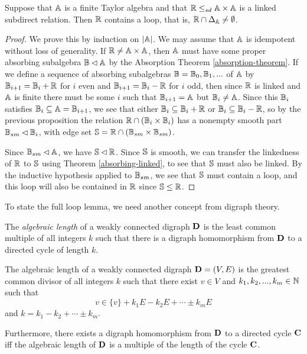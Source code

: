 \documentclass[letterpaper,11pt]{article}
\begin{document}
\begin{lem}\label{loop-linked} Suppose that $\mathbb{A}$ is a finite Taylor algebra and that $\mathbb{R} \le_{sd} \mathbb{A}\times \mathbb{A}$ is a linked subdirect relation. Then $\mathbb{R}$ contains a loop, that is, $\mathbb{R} \cap \Delta_{\mathbb{A}} \ne \emptyset$.
\end{lem}
\begin{proof} We prove this by induction on $|\mathbb{A}|$. We may assume that $\mathbb{A}$ is idempotent without loss of generality. If $\mathbb{R} \ne \mathbb{A}\times \mathbb{A}$, then $\mathbb{A}$ must have some proper absorbing subalgebra $\mathbb{B} \lhd \mathbb{A}$ by the Absorption Theorem \ref{absorption-theorem}. If we define a sequence of absorbing subalgebras $\mathbb{B} = \mathbb{B}_0, \mathbb{B}_1, ...$ of $\mathbb{A}$ by $\mathbb{B}_{i+1} = \mathbb{B}_i + \mathbb{R}$ for $i$ even and $\mathbb{B}_{i+1} = \mathbb{B}_i - \mathbb{R}$ for $i$ odd, then since $\mathbb{R}$ is linked and $\mathbb{A}$ is finite there must be some $i$ such that $\mathbb{B}_{i+1} = \mathbb{A}$ but $\mathbb{B}_i \ne \mathbb{A}$. Since this $\mathbb{B}_i$ satisfies $\mathbb{B}_i \subseteq \mathbb{A} = \mathbb{B}_{i+1}$, we see that either $\mathbb{B}_i \subseteq \mathbb{B}_i + \mathbb{R}$ or $\mathbb{B}_i \subseteq \mathbb{B}_i - \mathbb{R}$, so by the previous proposition the relation $\mathbb{R} \cap (\mathbb{B}_i \times \mathbb{B}_i)$ has a nonempty smooth part $\mathbb{B}_{sm} \lhd \mathbb{B}_i$, with edge set $\mathbb{S} = \mathbb{R} \cap (\mathbb{B}_{sm} \times \mathbb{B}_{sm})$.

Since $\mathbb{B}_{sm} \lhd \mathbb{A}$, we have $\mathbb{S} \lhd \mathbb{R}$. Since $\mathbb{S}$ is smooth, we can transfer the linkedness of $\mathbb{R}$ to $\mathbb{S}$ using Theorem \ref{absorbing-linked}, to see that $\mathbb{S}$ must also be linked. By the inductive hypothesis applied to $\mathbb{B}_{sm}$, we see that $\mathbb{S}$ must contain a loop, and this loop will also be contained in $\mathbb{R}$ since $\mathbb{S} \le \mathbb{R}$.
\end{proof}

To state the full loop lemma, we need another concept from digraph theory.

\begin{defn} The \emph{algebraic length} of a weakly connected digraph $\mathbf{D}$ is the least common multiple of all integers $k$ such that there is a digraph homomorphism from $\mathbf{D}$ to a directed cycle of length $k$.
\end{defn}

\begin{prop} The algebraic length of a weakly connected digraph $\mathbf{D} = (V,E)$ is the greatest common divisor of all integers $k$ such that there exist $v \in V$ and $k_1, k_2, ..., k_m \in \mathbb{N}$ such that
\[
v \in \{v\} + k_1E - k_2E + \cdots \pm k_mE
\]
and $k = k_1 - k_2 + \cdots \pm k_m$.

Furthermore, there exists a digraph homomorphism from $\mathbf{D}$ to a directed cycle $\mathbf{C}$ iff the algebraic length of $\mathbf{D}$ is a multiple of the length of the cycle $\mathbf{C}$.
\end{prop}
\end{document}

